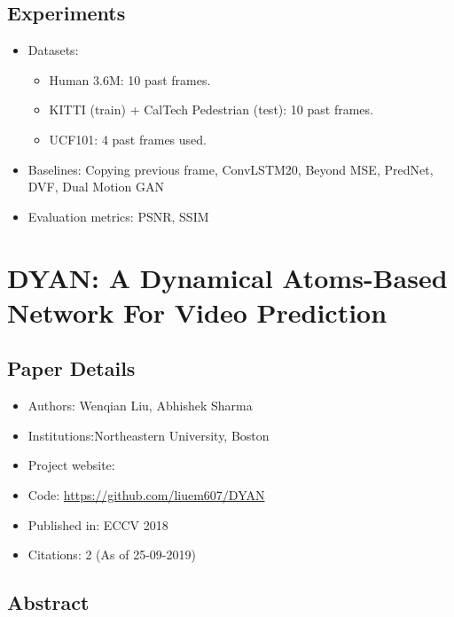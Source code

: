 \documentclass{article}
\begin{document}
    \subsection{Experiments}\label{subsec:ContextVP_Fully_Context_Aware_Video_Prediction:experiments}
    \begin{itemize}
        \item Datasets:
        \begin{itemize}
            \item Human 3.6M: 10 past frames.
            \item KITTI (train) + CalTech Pedestrian (test): 10 past frames.
            \item UCF101: 4 past frames used.
        \end{itemize}
        \item Baselines: Copying previous frame, ConvLSTM20, Beyond MSE, PredNet, DVF, Dual Motion GAN
        \item Evaluation metrics: PSNR, SSIM
    \end{itemize}
    \newpage


    \section{DYAN: A Dynamical Atoms-Based Network For Video Prediction}\label{sec:DYAN_A_Dynamical_Atoms_Based_Network_For_Video_Prediction}
    \subsection*{Paper Details}
    \begin{itemize}
        \item Authors: Wenqian Liu, Abhishek Sharma
        \item Institutions:Northeastern University, Boston
        \item Project website:
        \item Code: \url{https://github.com/liuem607/DYAN}
        \item Published in: ECCV 2018
        \item Citations: 2 (As of 25-09-2019)
    \end{itemize}

    \subsection*{Abstract}
\end{document}
